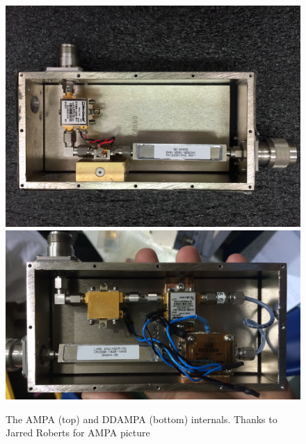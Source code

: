 \begin{figure}
\centering
	\includegraphics[height=0.45\textheight]{figures/AMPA}
	\includegraphics[height=0.45\textheight]{figures/DDAMPA}	
	\caption{The AMPA (top) and DDAMPA (bottom) internals.  Thanks to Jarred Roberts for AMPA picture}
	\label{fig:AMPAandDDAMPA}
\end{figure}	

